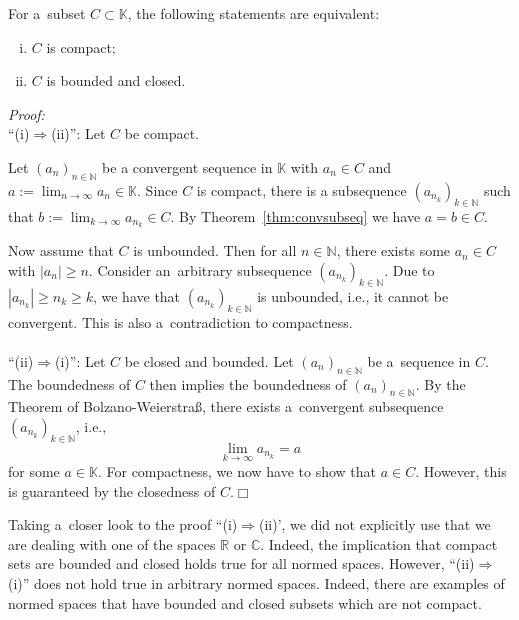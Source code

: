

\begin{Theorem}
For a~subset $C\subset\mathbb{K}$, the following statements are equivalent:
\begin{enumerate}[(i)]
 \item $C$ is compact;
 \item $C$ is bounded and closed.
\end{enumerate}
\end{Theorem}
{\em Proof:} \\
``(i)$\Rightarrow$(ii)'': Let $C$ be compact. 

Let $(a_n)_{n\in\mathbb{N}}$ be a convergent sequence in $\mathbb{K}$ with $a_n\in C$ and $a:=\lim_{n\rightarrow\infty} a_n \in\mathbb{K}$. 
Since $C$ is compact, there is a subsequence $(a_{n_k})_{k\in\mathbb{N}}$ such that $b:=\lim_{k\rightarrow\infty} a_{n_k}\in C$.
By Theorem~\ref{thm:convsubseq} we have $a=b\in C$.

Now assume that $C$ is unbounded. Then for all $n\in\mathbb{N}$, there exists some $a_n\in C$ with $|a_n|\geq n$. Consider an~arbitrary subsequence $(a_{n_k})_{k\in\mathbb{N}}$. Due to $|a_{n_k}|\geq n_k\geq k$, we have that $(a_{n_k})_{k\in\mathbb{N}}$ is unbounded, i.e., it cannot be convergent. This is also a~contradiction to compactness.\\
~\\
``(ii)$\Rightarrow$(i)'':
Let $C$ be closed and bounded. Let  $(a_n)_{n\in\mathbb{N}}$ be a~sequence in $C$. The boundedness of $C$ then implies the boundedness of $(a_n)_{n\in\mathbb{N}}$. By the Theorem of Bolzano-Weierstra\ss, there exists a~convergent subsequence  $(a_{n_k})_{k\in\mathbb{N}}$, i.e.,
\[\lim_{k\to\infty}a_{n_k}=a\]
for some $a\in\mathbb{K}$. For compactness, we now have to show that $a\in C$. However, this is guaranteed by the closedness of $C$.\hfill$\Box$
\begin{Remark}{}
    Taking a~closer look to the proof ``(i)$\Rightarrow$(ii)', we did not explicitly use that we are dealing with one of the spaces $\mathbb{R}$ or $\mathbb{C}$. Indeed, the implication that compact sets are bounded and closed holds true for all normed spaces. However, ``(ii)$\Rightarrow$(i)'' does not hold true in arbitrary normed spaces. Indeed, there are examples of normed spaces that have bounded and closed subsets which are not compact.
\end{Remark}
